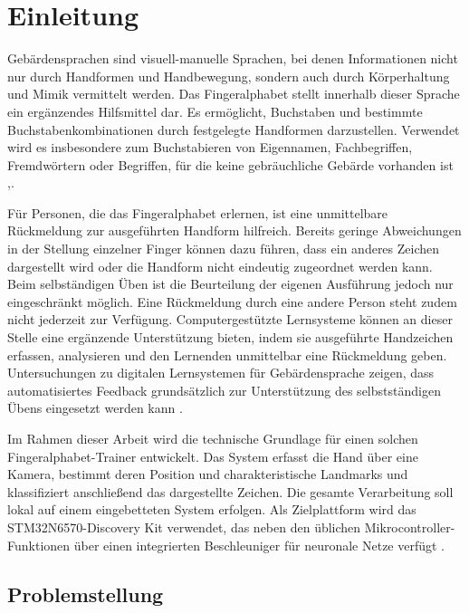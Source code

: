 \chapter{Einleitung}

Gebärdensprachen sind visuell-manuelle Sprachen, bei denen Informationen nicht nur durch Handformen und Handbewegung, sondern auch durch Körperhaltung und Mimik vermittelt werden. Das Fingeralphabet stellt innerhalb dieser Sprache ein ergänzendes Hilfsmittel dar. Es ermöglicht, Buchstaben und bestimmte Buchstabenkombinationen durch festgelegte Handformen darzustellen. Verwendet wird es insbesondere zum Buchstabieren von Eigennamen, Fachbegriffen, Fremdwörtern oder Begriffen, für die keine gebräuchliche Gebärde vorhanden ist \cite{aktion-mensch},\cite{DeutscheGebaerdensprache}.


Für Personen, die das Fingeralphabet erlernen, ist eine unmittelbare Rückmeldung zur ausgeführten Handform hilfreich. Bereits geringe Abweichungen in der Stellung einzelner Finger können dazu führen, dass ein anderes Zeichen dargestellt wird oder die Handform nicht eindeutig zugeordnet werden kann. Beim selbständigen Üben ist die Beurteilung der eigenen Ausführung jedoch nur eingeschränkt möglich. Eine Rückmeldung durch eine andere Person steht zudem nicht jederzeit zur Verfügung. Computergestützte Lernsysteme können an dieser Stelle eine ergänzende Unterstützung bieten, indem sie ausgeführte Handzeichen erfassen, analysieren und den Lernenden unmittelbar eine Rückmeldung geben. Untersuchungen zu digitalen Lernsystemen für Gebärdensprache zeigen, dass automatisiertes Feedback grundsätzlich zur Unterstützung des selbstständigen Übens eingesetzt werden kann \cite{huenerfauthEvaluationLanguageFeedback2017}.

Im Rahmen dieser Arbeit wird die technische Grundlage für einen solchen Fingeralphabet-Trainer entwickelt. Das System erfasst die Hand über eine Kamera, bestimmt deren Position und charakteristische Landmarks und klassifiziert anschließend das dargestellte Zeichen. Die gesamte Verarbeitung soll lokal auf einem eingebetteten System erfolgen. Als Zielplattform wird das STM32N6570-Discovery Kit verwendet, das neben den üblichen Mikrocontroller-Funktionen über einen integrierten Beschleuniger für neuronale Netze verfügt \cite{STM32N6570DKProductSTMicroelectronics}.

\section{Problemstellung}

